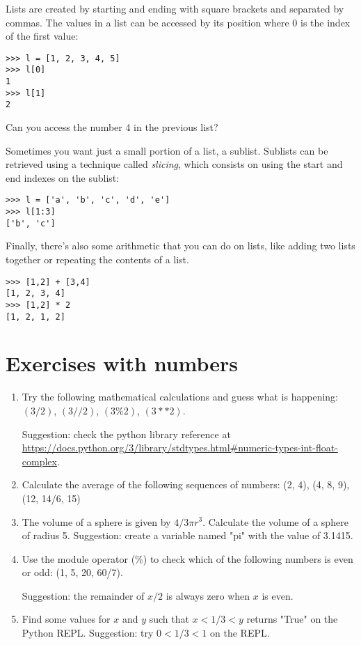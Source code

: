 Lists are created by starting and ending with square brackets and separated by commas. The values in a list can be accessed by its position where 0 is the index of the first value:

\begin{lstlisting}
>>> l = [1, 2, 3, 4, 5]
>>> l[0]
1
>>> l[1]
2
\end{lstlisting}

Can you access the number 4 in the previous list?

Sometimes you want just a small portion of a list, a sublist. Sublists can be retrieved using a technique called \textit{slicing}, which consists on using the start and end indexes on the sublist:

\begin{lstlisting}
>>> l = ['a', 'b', 'c', 'd', 'e']
>>> l[1:3]
['b', 'c']
\end{lstlisting}

Finally, there's also some arithmetic that you can do on lists, like adding two lists together or repeating the contents of a list.

\begin{lstlisting}
>>> [1,2] + [3,4]
[1, 2, 3, 4]
>>> [1,2] * 2
[1, 2, 1, 2]
\end{lstlisting}


\section{Exercises with numbers}

\begin{enumerate}

\item Try the following mathematical calculations and guess what is happening: $(3 / 2)$, $(3 // 2)$, $(3 \% 2)$, $(3**2)$.

Suggestion: check the python library reference at \url{https://docs.python.org/3/library/stdtypes.html#numeric-types-int-float-complex}.

\item Calculate the average of the following sequences of numbers: (2, 4), (4, 8, 9), (12, 14/6, 15)

\item The volume of a sphere is given by $4/3\pi r^3$. Calculate the volume of a sphere of radius 5. Suggestion: create a variable named "pi" with the value of 3.1415.

\item Use the module operator (\%) to check which of the following numbers is even or odd: (1, 5, 20, 60/7).

Suggestion: the remainder of $x/2$ is always zero when $x$ is even.

\item Find some values for $x$ and $y$ such that $x < 1/3 < y$ returns "True" on the Python REPL. Suggestion: try $0 < 1/3 < 1$ on the REPL.

\end{enumerate}

